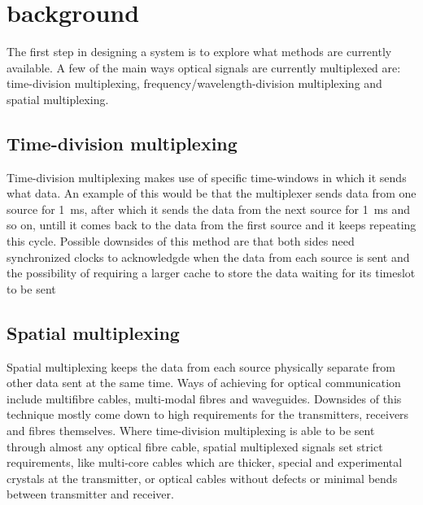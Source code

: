 \section{background}
\label{sec:background}

The first step in designing a system is to explore what methods are currently 
available. A few of the main ways optical signals are currently multiplexed are: time-division 
multiplexing, frequency/wavelength-division multiplexing and spatial multiplexing.

\subsection{Time-division multiplexing}
Time-division multiplexing makes use of specific time-windows in which it sends what data.
An example of this would be that the multiplexer sends data from one source for \qty{1}{\ms}, 
after which it sends the data from the next source for \qty{1}{\ms} and so on, untill it comes 
back to the data from the first source and it keeps repeating this cycle. Possible downsides of
this method are that both sides need synchronized clocks to acknowledgde when the data from 
each source is sent and the possibility of requiring a larger cache to store the data waiting 
for its timeslot to be sent

\subsection{Spatial multiplexing}
Spatial multiplexing keeps the data from each source physically separate from other data sent 
at the same time. Ways of achieving for optical communication include multifibre cables, 
multi-modal fibres and waveguides. Downsides of this technique mostly come down to high requirements 
for the transmitters, receivers and fibres themselves. Where time-division multiplexing is able to be 
sent through almost any optical fibre cable, spatial multiplexed signals set strict requirements, like 
multi-core cables which are thicker, special and experimental crystals at the transmitter, or optical cables 
without defects or minimal bends between transmitter and receiver.

